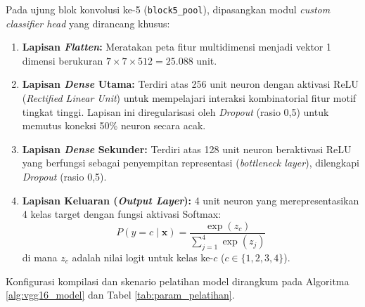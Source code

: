 \documentclass[10pt,a4paper]{article}
\begin{document}
Pada ujung blok konvolusi ke-5 (\texttt{block5\_pool}), dipasangkan modul \textit{custom classifier head} yang dirancang khusus:
\begin{enumerate}
  \item \textbf{Lapisan \textit{Flatten}:} Meratakan peta fitur multidimensi menjadi vektor 1 dimensi berukuran $7 \times 7 \times 512 = 25.088$ unit.
  \item \textbf{Lapisan \textit{Dense} Utama:} Terdiri atas 256 unit neuron dengan aktivasi ReLU (\textit{Rectified Linear Unit}) untuk mempelajari interaksi kombinatorial fitur motif tingkat tinggi. Lapisan ini diregularisasi oleh \textit{Dropout} (rasio 0,5) untuk memutus koneksi 50\% neuron secara acak.
  \item \textbf{Lapisan \textit{Dense} Sekunder:} Terdiri atas 128 unit neuron beraktivasi ReLU yang berfungsi sebagai penyempitan representasi (\textit{bottleneck layer}), dilengkapi \textit{Dropout} (rasio 0,5).
  \item \textbf{Lapisan Keluaran (\textit{Output Layer}):} 4 unit neuron yang merepresentasikan 4 kelas target dengan fungsi aktivasi Softmax:
  \begin{equation}
    P(y = c \mid \mathbf{x}) = \frac{\exp(z_c)}{\sum_{j=1}^{4} \exp(z_j)}
    \label{eq:softmax}
  \end{equation}
  di mana $z_c$ adalah nilai logit untuk kelas ke-$c$ ($c \in \{1, 2, 3, 4\}$).
\end{enumerate}

Konfigurasi kompilasi dan skenario pelatihan model dirangkum pada Algoritma \ref{alg:vgg16_model} dan Tabel \ref{tab:param_pelatihan}.
\end{document}
